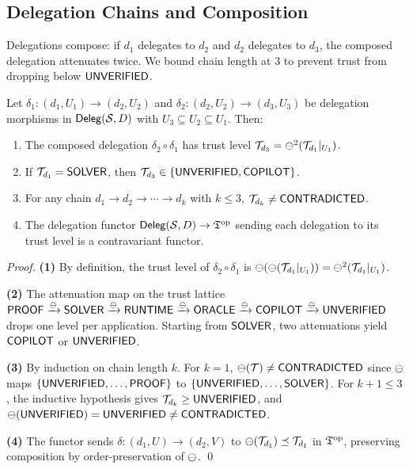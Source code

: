 \documentclass[11pt]{article}
\newcommand{\op}{\mathrm{op}}
\newcommand{\DelegCat}{\mathsf{Deleg}}
\begin{document}
\subsection{Delegation Chains and Composition}

Delegations compose: if $d_1$ delegates to $d_2$ and $d_2$ delegates to $d_3$,
the composed delegation attenuates twice. We bound chain length at 3 to prevent
trust from dropping below $\mathsf{UNVERIFIED}$.

\begin{theorem}\label{thm:deleg-compose}
Let $\delta_1 : (d_1, U_1) \to (d_2, U_2)$ and
$\delta_2 : (d_2, U_2) \to (d_3, U_3)$ be delegation morphisms in
$\DelegCat(\Site, D)$ with $U_3 \subseteq U_2 \subseteq U_1$. Then:
\begin{enumerate}
  \item The composed delegation $\delta_2 \circ \delta_1$ has trust level
        $\mathcal{T}_{d_3} = \ominus^2(\mathcal{T}_{d_1}|_{U_1})$.
  \item If $\mathcal{T}_{d_1} = \mathsf{SOLVER}$, then
        $\mathcal{T}_{d_3} \in \{\mathsf{UNVERIFIED}, \mathsf{COPILOT}\}$.
  \item For any chain $d_1 \to d_2 \to \cdots \to d_k$ with $k \leq 3$,
        $\mathcal{T}_{d_k} \neq \mathsf{CONTRADICTED}$.
  \item The delegation functor $\DelegCat(\Site, D) \to \Talg^{\op}$ sending
        each delegation to its trust level is a contravariant functor.
\end{enumerate}
\end{theorem}

\begin{proof}
\textbf{(1)} By definition, the trust level of
$\delta_2 \circ \delta_1$ is $\ominus(\ominus(\mathcal{T}_{d_1}|_{U_1})) =
\ominus^2(\mathcal{T}_{d_1}|_{U_1})$.

\textbf{(2)} The attenuation map on the trust lattice
$\mathsf{PROOF} \xrightarrow{\ominus} \mathsf{SOLVER} \xrightarrow{\ominus} \mathsf{RUNTIME}
\xrightarrow{\ominus} \mathsf{ORACLE} \xrightarrow{\ominus} \mathsf{COPILOT}
\xrightarrow{\ominus} \mathsf{UNVERIFIED}$ drops one level per application. Starting from
$\mathsf{SOLVER}$, two attenuations yield $\mathsf{COPILOT}$ or $\mathsf{UNVERIFIED}$.

\textbf{(3)} By induction on chain length $k$. For $k = 1$,
$\ominus(\mathcal{T}) \neq \mathsf{CONTRADICTED}$ since $\ominus$ maps
$\{\mathsf{UNVERIFIED}, \ldots, \mathsf{PROOF}\}$ to $\{\mathsf{UNVERIFIED}, \ldots, \mathsf{SOLVER}\}$.
For $k + 1 \leq 3$, the inductive hypothesis gives
$\mathcal{T}_{d_k} \geq \mathsf{UNVERIFIED}$, and $\ominus(\mathsf{UNVERIFIED}) = \mathsf{UNVERIFIED} \neq \mathsf{CONTRADICTED}$.

\textbf{(4)} The functor sends $\delta : (d_1, U) \to (d_2, V)$ to
$\ominus(\mathcal{T}_{d_1}) \preceq \mathcal{T}_{d_1}$ in $\Talg^{\op}$, preserving
composition by order-preservation of $\ominus$. \qed
\end{proof}
\end{document}
